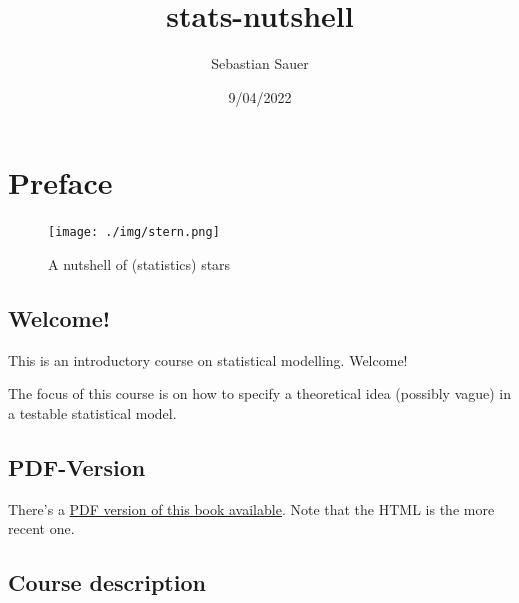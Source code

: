 \documentclass[
  letterpaper,
  DIV=11,
  numbers=noendperiod]{scrreprt}
\title{stats-nutshell}
\author{Sebastian Sauer}
\date{9/04/2022}
\renewcommand*\contentsname{Table of contents}
\newcommand\contentsname{Table of contents}
\theoremstyle{definition}
\theoremstyle{definition}
\theoremstyle{remark}
\begin{document}
\maketitle
\ifdefined\Shaded\renewenvironment{Shaded}{\begin{tcolorbox}[sharp corners, borderline west={3pt}{0pt}{shadecolor}, boxrule=0pt, frame hidden, breakable, enhanced, interior hidden]}{\end{tcolorbox}}\fi

\renewcommand*\contentsname{Table of contents}
{
\hypersetup{linkcolor=}
\setcounter{tocdepth}{2}
\tableofcontents
}

\hypertarget{preface}{%
\chapter*{Preface}\label{preface}}

\begin{figure}

{\centering \texttt{[image: ./img/stern.png]}

}

\caption{A nutshell of (statistics) stars}

\end{figure}

\hypertarget{welcome}{%
\section*{Welcome!}\label{welcome}}

This is an introductory course on statistical modelling. Welcome!

The focus of this course is on how to specify a theoretical idea
(possibly vague) in a testable statistical model.

\hypertarget{pdf-version}{%
\section*{PDF-Version}\label{pdf-version}}

There's a
\href{https://stats-nutshell.netlify.app/stats-nutshell.pdf}{PDF version
of this book available}. Note that the HTML is the more recent one.

\hypertarget{course-description}{%
\section*{Course description}\label{course-description}}
\end{document}
